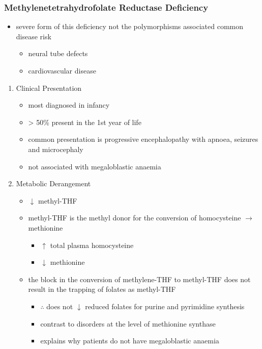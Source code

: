 \documentclass{scrartcl}
\begin{document}
\subsubsection{Methylenetetrahydrofolate Reductase Deficiency}
\label{sec:org7374f7d}
\begin{itemize}
\item severe form of this deficiency not the polymorphisms associated
common disease risk
\begin{itemize}
\item neural tube defects
\item cardiovascular disease
\end{itemize}
\end{itemize}
\begin{enumerate}
\item Clinical Presentation
\label{sec:orgb9a3f24}
\begin{itemize}
\item most diagnosed in infancy
\item \textgreater{} 50\% present in the 1st year of life
\item common presentation is progressive encephalopathy with apnoea,
seizures and microcephaly
\item not associated with megaloblastic anaemia
\end{itemize}

\item Metabolic Derangement
\label{sec:org6b54437}
\begin{itemize}
\item \(\downarrow\) methyl-THF
\item methyl-THF is the methyl donor for the conversion of homocysteine \(\to\) methionine
\begin{itemize}
\item \(\uparrow\) total plasma homocysteine
\item \(\downarrow\) methionine
\end{itemize}
\item the block in the conversion of methylene-THF to methyl-THF does not
result in the trapping of folates as methyl-THF
\begin{itemize}
\item \(\therefore\) does not \(\downarrow\) reduced folates for purine and
pyrimidine synthesis
\item contrast to disorders at the level of methionine synthase
\item explains why patients do not have megaloblastic anaemia
\end{itemize}
\end{itemize}


\end{enumerate}
\end{document}
